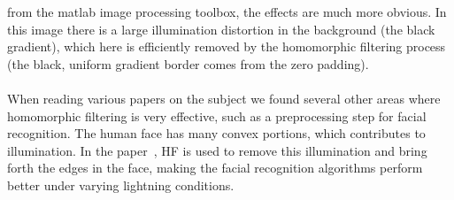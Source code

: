 		from the matlab image processing toolbox, the effects are much more obvious. 
		In this image there is a large illumination
		distortion in the background (the black gradient), which here is efficiently 
		removed by the homomorphic filtering process (the black, uniform gradient border
		comes from the zero padding). \\
		\\
		When reading various papers on the
		subject we found several other areas where homomorphic filtering is very effective,
		such as a preprocessing step for facial recognition. The human face has many convex
		portions, which contributes to illumination. In the paper~\cite{Fan20111468}, HF
		is used to remove this illumination and bring forth the edges in the face, making
		the facial recognition algorithms perform better under varying lightning conditions.
%  
